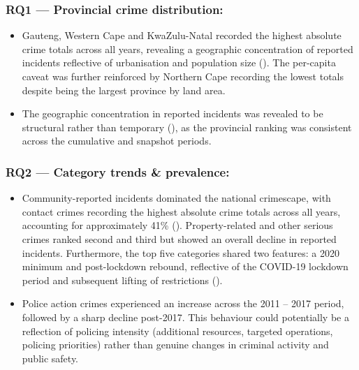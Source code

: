 \documentclass[titlepage, 12pt, oneside]{article}
\numberwithin{equation}{section}
\begin{document}
	\begin{tcolorbox}[
		colback=darkgreen!8!white,
		colframe=darkgreen,
		title={\textbf{Key Findings}},
		fonttitle=\bfseries,
		rounded corners,
		breakable]
		\subsubsection*{RQ1 --- Provincial crime distribution:}
		\begin{itemize}
			\item Gauteng, Western Cape and KwaZulu-Natal recorded the highest absolute crime totals across all years, revealing a geographic concentration of reported incidents reflective of urbanisation and population size (\cite{saps2023}). The per-capita caveat was further reinforced by Northern Cape recording the lowest totals despite being the largest province by land area.
			\item The geographic concentration in reported incidents was revealed to be structural rather than temporary (\cite{saps2023}), as the provincial ranking was consistent across the cumulative and snapshot periods.
		\end{itemize}
		\subsubsection*{RQ2 --- Category trends \& prevalence:}
		\begin{itemize}
			\item Community-reported incidents dominated the national crimescape, with contact crimes recording the highest absolute crime totals across all years, accounting for approximately 41\% (\cite{iss}). Property-related and other serious crimes ranked second and third but showed an overall decline in reported incidents. Furthermore, the top five categories shared two features: a 2020 minimum and post-lockdown rebound, reflective of the COVID-19 lockdown period and subsequent lifting of restrictions (\cite{faull2021}).
			\item Police action crimes experienced an increase across the 2011 -- 2017 period, followed by a sharp decline post-2017. This behaviour could potentially be a reflection of policing intensity (additional resources, targeted operations, policing priorities) rather than genuine changes in criminal activity and public safety. 
		\end{itemize}

\end{tcolorbox}
\end{document}
